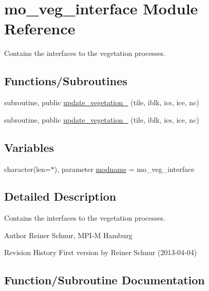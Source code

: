 \hypertarget{namespacemo__veg__interface}{}\section{mo\+\_\+veg\+\_\+interface Module Reference}
\label{namespacemo__veg__interface}


Contains the interfaces to the vegetation processes.  


\subsection*{Functions/\+Subroutines}
\begin{DoxyCompactItemize}
\item 
subroutine, public \hyperlink{namespacemo__veg__interface_a3663bc9118551ffb7d52763535228d89}{update\+\_\+vegetation\+\_} (tile, iblk, ics, ice, nc)
\item 
subroutine, public \hyperlink{namespacemo__veg__interface_a58ea81b4305df127f8b495a40b520eae}{update\+\_\+vegetation\+\_} (tile, iblk, ics, ice, nc)
\end{DoxyCompactItemize}
\subsection*{Variables}
\begin{DoxyCompactItemize}
\item 
character(len=$\ast$), parameter \hyperlink{namespacemo__veg__interface_a8187c713accfd2ec663731108d9ad611}{modname} = \textquotesingle{}mo\+\_\+veg\+\_\+interface\textquotesingle{}
\end{DoxyCompactItemize}


\subsection{Detailed Description}
Contains the interfaces to the vegetation processes. 

\begin{DoxyAuthor}{Author}
Reiner Schnur, M\+P\+I-\/\+M Hamburg
\end{DoxyAuthor}
\begin{DoxyParagraph}{Revision History}
First version by Reiner Schnur (2013-\/04-\/04) 
\end{DoxyParagraph}


\subsection{Function/\+Subroutine Documentation}
\hypertarget{namespacemo__veg__interface_a3663bc9118551ffb7d52763535228d89}{}
